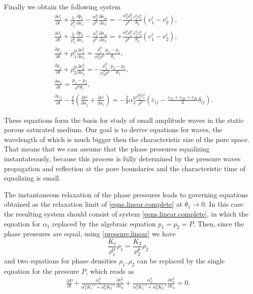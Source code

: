 \documentclass[3p,times]{elsarticle}
\begin{document}
Finally we obtain the following system 
\begin{eqnarray}\label{eqns.linear.complete}
&&\frac{\partial v^i_1}{\partial t}+
\frac{1}{\rho_1^0}\frac{\partial p_1}{\partial x_i}- \frac{\alpha_2^0}{\rho^0}
\frac{\partial \tilde \sigma_{ik}}{\partial x_k}
=-\frac{\alpha_2^0 \rho_2^0}{\rho^0}\frac{c_1^0c_2^0}{\theta_2}(v_1^i-v_2^i), \nonumber \\
&&\frac{\partial v^i_2}{\partial t}+
\frac{1}{\rho_2^0}\frac{\partial p_2}{\partial x_i}- \frac{\alpha_2^0}{\rho^0}
\frac{\partial \tilde \sigma_{ik}}{\partial x_k}
=+\frac{\alpha_1^0 \rho_1^0}{\rho^0}\frac{c_1^0c_2^0}{\theta_2}(v_1^i-v_2^i), \nonumber \\
%
&&\frac{\partial \rho_1}{\partial t}+\rho_1^0 \frac{\partial v^k_1}{\partial x_k}=
\frac{\rho_1^0}{\alpha_1^0 \rho^0} \frac{p_2-p_1}{\theta_1},   \\
&&\frac{\partial \rho_2}{\partial t}+\rho_2^0 \frac{\partial v^k_2}{\partial x_k}=
-\frac{\rho_2^0}{\alpha_2^0 \rho^0} \frac{p_2-p_1}{\theta_1},  \nonumber \\
&&\frac{\partial \alpha_1}{\partial t}= \frac{p_1-p_2}{\rho^0 \theta_1},  \nonumber \\
&&\frac{\partial \varepsilon_{ij}}{\partial t} - 
\frac{1}{2}\left(\frac{\partial v^i}{\partial x_j}+\frac{\partial v^j}{\partial x_i} \right) = 
-\frac{2}{\theta}\alpha_2^0 \frac{\rho_2^0 c^2_s}{\rho^0} \left(\varepsilon_{ij}-\frac{\varepsilon_{11}+\varepsilon_{22}+\varepsilon_{22}}{3}\delta_{ij}\right). \nonumber 
\end{eqnarray}

These equations form the basis for study of small amplitude waves in the static porous saturated medium. Our goal is to derive equations for waves, the wavelength of which is much bigger then the characteristic size of the pore space. That means that we can assume that the phase pressures equalizing instantateously, because this process is fully determined by the pressure waves propagation and reflection at the pore boundaries and the characteristic time of equalizing is small.   

The instantaneous relaxation of the phase pressures leads to governing equations obtained as the relaxation limit of \eqref{eqns.linear.complete} at $\theta_1 \rightarrow 0$.
In this case the resulting system should consist of system \eqref{eqns.linear.complete}, in which the equation for $\alpha_1$ replaced by the algebraic equation $p_1=p_2=P$. Then, since the phase pressures are equal, using \eqref {pressure.linear} we have 
$$\frac{K_1}{\rho^0_1} \rho_1=\frac{K_2}{\rho^0_2} \rho_2$$  
and two equations for phase densities $\rho_1,\rho_2$ can be replaced by the single equation for the pressure $P$, which reads as
\begin{align}\label{pressure.equation}
\frac{\partial P}{\partial t} +\frac{\alpha_1^0}{\alpha_1^0 K_1^{-1}+\alpha_2^0 K_2^{-1}}
\frac{\partial v_1^k}{\partial x_k}+
\frac{\alpha_2^0}{\alpha_1^0 K_1^{-1}+\alpha_2^0 K_2^{-1}}
\frac{\partial v_2^k}{\partial x_k} =0.
\end{align}
\end{document}

